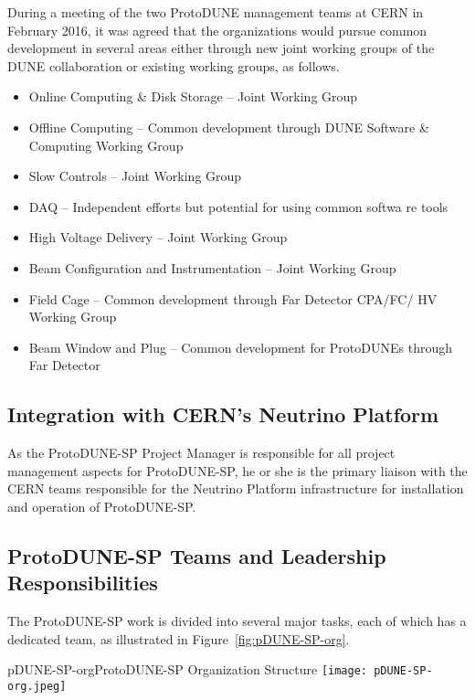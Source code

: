 During a meeting of the two ProtoDUNE management teams at CERN in February 2016, it was agreed that the organizations would pursue common development in several areas either through new joint working groups of the DUNE collaboration or existing working groups, as follows.


\begin{itemize}
\item Online Computing \& Disk Storage – Joint Working Group
\item Offline Computing – Common development through DUNE Software \& Computing Working Group
\item Slow Controls – Joint Working Group
\item DAQ – Independent efforts but potential for using common softwa
re tools
\item High Voltage Delivery – Joint Working Group
\item Beam Configuration and Instrumentation – Joint Working Group
\item Field Cage – Common development through Far Detector CPA/FC/ HV Working Group
\item Beam Window and Plug – Common development for ProtoDUNEs through Far Detector
\end{itemize}

\subsection{Integration with CERN's Neutrino Platform}

As the ProtoDUNE-SP Project Manager is responsible for all project management aspects for ProtoDUNE-SP, he or she is the primary liaison with the CERN teams responsible for the Neutrino Platform infrastructure for installation and operation of ProtoDUNE-SP. 

\subsection{ProtoDUNE-SP Teams and Leadership Responsibilities}

The ProtoDUNE-SP work is divided into several major tasks, each of which has a dedicated team, as illustrated in Figure~\ref{fig:pDUNE-SP-org}.

\begin{cdrfigure}{pDUNE-SP-org}{ProtoDUNE-SP Organization Structure}
  \texttt{[image: pDUNE-SP-org.jpeg]}
\end{cdrfigure}

